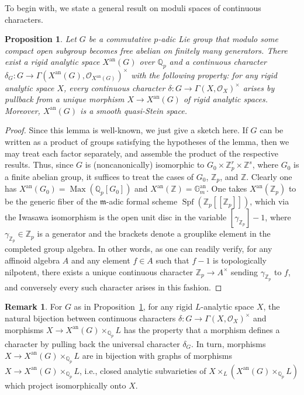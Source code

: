 \documentclass[12pt]{article}
\newtheorem{prop}[theorem]{Proposition}
\theoremstyle{definition}
\newtheorem{remark}[theorem]{Remark}
\numberwithin{equation}{theorem}
\newcommand{\calO}{\mathcal{O}}
\newcommand{\gothm}{\mathfrak{m}}
\newcommand{\QQ}{\mathbb{Q}}
\newcommand{\ZZ}{\mathbb{Z}}
\newcommand{\bbG}{\mathbb{G}}
\newcommand{\an}{\mathrm{an}}
\def\Qp{\QQ_p}
\newcommand{\Zp}{\ZZ_p}
\DeclareMathOperator{\Max}{Max}
\begin{document}
To begin with, we state a general result on moduli spaces of continuous characters.

\begin{prop} \label{P:moduli space of characters}
Let $G$ be a commutative $p$-adic Lie group that modulo some compact open subgroup becomes free abelian on finitely many generators.  There exist a rigid analytic space $X^\an(G)$ over $\Qp$ and a continuous character $\delta_G: G \to \Gamma(X^\an(G), \calO_{X^\an(G)})^\times$ with the following property: for any rigid analytic space $X$, every continuous character $\delta: G \to \Gamma(X, \calO_X)^\times$ arises by pullback from a unique morphism $X \to X^\an(G)$ of rigid analytic spaces. Moreover, $X^{\an}(G)$ is a smooth quasi-Stein space.
\end{prop}
\begin{proof}
Since this lemma is well-known, we just give a sketch here.
If $G$ can be written as a product of groups satisfying the hypotheses of the lemma, then we may treat each factor separately, and assemble the product of the respective results.  Thus, since $G$ is (noncanonically) isomorphic to $G_0 \times \Zp^r \times \ZZ^s$, where $G_0$ is a finite abelian group, it suffices to treat the cases of $G_0$, $\Zp$, and $\ZZ$.  Clearly one has $X^\an(G_0) = \Max(\Qp[G_0])$ and $X^\an(\ZZ) = \bbG_m^\an$.  One takes $X^\an(\Zp)$ to be the generic fiber of the $\gothm$-adic formal scheme $\mathop{\mathrm{Spf}}(\Zp[\![\Zp]\!])$, which via the Iwasawa isomorphism is the open unit disc in the variable $[\gamma_{\Zp}]-1$, where $\gamma_{\Zp} \in \Zp$ is a generator and the brackets denote a grouplike element in the completed group algebra.  In other words, as one can readily verify, for any affinoid algebra $A$ and any element $f \in A$ such that $f-1$ is topologically nilpotent, there exists a unique continuous character $\Zp \to A^\times$ sending $\gamma_{\Zp}$ to $f$, and 
conversely every such character arises in this fashion.
\end{proof}

\begin{remark}
For $G$ as in Proposition~\ref{P:moduli space of characters},
for any rigid $L$-analytic space $X$,
the natural bijection between continuous characters $\delta: G \to \Gamma(X, \calO_X)^\times$ and morphisms $X \to X^{\an}(G) \times_{\Qp} L$ has the property that a morphism defines a character by pulling back the universal character $\delta_G$.
In turn, morphisms $X \to X^{\an}(G) \times_{\Qp} L$ are in bijection with graphs of morphisms $X \to X^{\an}(G) \times_{\Qp} L$, i.e., closed analytic subvarieties of $X \times_L (X^{\an}(G) \times_{\Qp} L)$ which project isomorphically onto $X$.
\end{remark}
\end{document}
